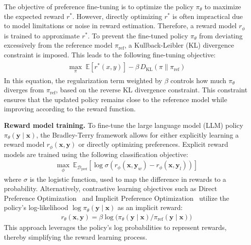 The objective of preference fine-tuning is to optimize the policy $\pi_{\theta}$ to maximize the expected reward $r^*$. However, directly optimizing $r^*$ is often impractical due to model limitations or noise in reward estimation. Therefore, a reward model $r_{\phi}$ is trained to approximate $r^*$. To prevent the fine-tuned policy $\pi_{\theta}$ from deviating excessively from the reference model $\pi_{\text{ref}}$, a Kullback-Leibler (KL) divergence constraint is imposed. This leads to the following fine-tuning objective:
\begin{align}
\label{eq:rlhf_objective}
\begin{split}
\max_{\pi} \; \mathbb{E}[r^*(x,y)] - \beta\, D_\text{KL}(\pi\parallel\pi_{\text{ref}})
\end{split}
\end{align}
In this equation, the regularization term weighted by $\beta$ controls how much $\pi_{\theta}$ diverges from $\pi_{\text{ref}}$, based on the reverse KL divergence constraint. This constraint ensures that the updated policy remains close to the reference model while improving according to the reward function.

\noindent \textbf{Reward model training.} To fine-tune the large language model (LLM) policy $\pi_{\theta}(\mathbf{y} \mid \mathbf{x})$, the Bradley-Terry framework allows for either explicitly learning a reward model $r_{\phi}(\mathbf{x}, \mathbf{y})$ or directly optimizing preferences. Explicit reward models are trained using the following classification objective:
\begin{align}
\label{eq:reward_learning}
\max_{\phi}~ \mathbb{E}_{\mathcal{D}_{\text{pref}}} \left[\log \sigma \left(r_{\phi}(\mathbf{x}, \mathbf{y}_w) - r_{\phi}(\mathbf{x}, \mathbf{y}_l) \right) \right]
\end{align}
where $\sigma$ is the logistic function, used to map the difference in rewards to a probability. Alternatively, contrastive learning objectives such as Direct Preference Optimization~\citep{rafailov2023direct} and Implicit Preference Optimization~\citep{2023arXiv231012036G} utilize the policy’s log-likelihood $\log \pi_{\theta}(\mathbf{y} \mid \mathbf{x})$ as an implicit reward:
\begin{align} \label{eq:contrastive_parameterization} r_{\theta}(\mathbf{x}, \mathbf{y}) = \beta \log \big( \pi_{\theta}(\mathbf{y} \mid \mathbf{x}) / \pi_{\text{ref}}(\mathbf{y} \mid \mathbf{x}) \big) \end{align}
This approach leverages the policy’s log probabilities to represent rewards, thereby simplifying the reward learning process.